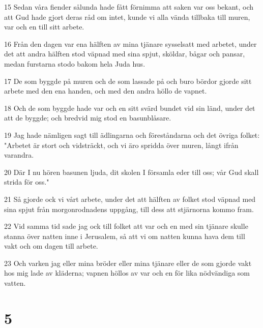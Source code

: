 \par 15 Sedan våra fiender sålunda hade fått förnimma att saken var oss bekant, och att Gud hade gjort deras råd om intet, kunde vi alla vända tillbaka till muren, var och en till sitt arbete.
\par 16 Från den dagen var ena hälften av mina tjänare sysselsatt med arbetet, under det att andra hälften stod väpnad med sina spjut, sköldar, bågar och pansar, medan furstarna stodo bakom hela Juda hus.
\par 17 De som byggde på muren och de som lassade på och buro bördor gjorde sitt arbete med den ena handen, och med den andra höllo de vapnet.
\par 18 Och de som byggde hade var och en sitt svärd bundet vid sin länd, under det att de byggde; och bredvid mig stod en basunblåsare.
\par 19 Jag hade nämligen sagt till ädlingarna och föreståndarna och det övriga folket: "Arbetet är stort och vidsträckt, och vi äro spridda över muren, långt ifrån varandra.
\par 20 Där I nu hören basunen ljuda, dit skolen I församla eder till oss; vår Gud skall strida för oss."
\par 21 Så gjorde ock vi vårt arbete, under det att hälften av folket stod väpnad med sina spjut från morgonrodnadens uppgång, till dess att stjärnorna kommo fram.
\par 22 Vid samma tid sade jag ock till folket att var och en med sin tjänare skulle stanna över natten inne i Jerusalem, så att vi om natten kunna hava dem till vakt och om dagen till arbete.
\par 23 Och varken jag eller mina bröder eller mina tjänare eller de som gjorde vakt hos mig lade av kläderna; vapnen höllos av var och en för lika nödvändiga som vatten.

\chapter{5}

